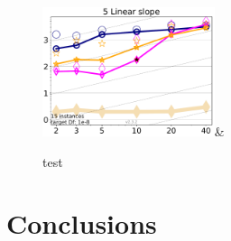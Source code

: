 \documentclass[review]{elsarticle}
\begin{document}
\begin{figure}[h!tb]
\begin{tabular}
        \includegraphics[width=0.45\textwidth]{ppfigs_f005}&
        \\
        \end{tabular}
        \vspace{-3ex}
         \caption{test}
    \end{figure}    

\section{Conclusions} 
\label{conclusions}



\end{document}
